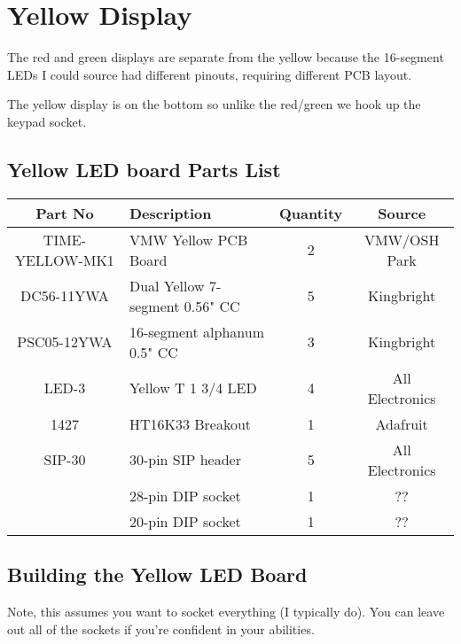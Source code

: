 \documentclass[11pt]{article}
\begin{document}
\pagebreak
\section{Yellow Display}

The red and green displays are separate from the yellow because
the 16-segment LEDs I could source had different pinouts, requiring
different PCB layout.

The yellow display is on the bottom so unlike the red/green we
hook up the keypad socket.

\subsection{Yellow LED board Parts List}

\begin{tabular}{|c|l|c|c|}
\hline
Part No   &  Description    &  Quantity    &   Source \\
\hline
\hline
TIME-YELLOW-MK1& VMW Yellow PCB Board          & 2 & VMW/OSH Park\\ %
\hline
DC56-11YWA     & Dual Yellow 7-segment 0.56" CC& 5 & Kingbright\\ %
\hline
PSC05-12YWA    & 16-segment alphanum 0.5" CC   & 3 & Kingbright\\ %
\hline
LED-3          & Yellow T 1 3/4 LED            & 4 & All Electronics\\ %
\hline
1427           & HT16K33 Breakout              & 1 & Adafruit\\ %
\hline
SIP-30	       & 30-pin SIP header             & 5 & All Electronics\\ %
\hline
               & 28-pin DIP socket             & 1 & ?? \\ %
\hline
               & 20-pin DIP socket             & 1 & ?? \\ %
\hline
\end{tabular}


\subsection{Building the Yellow LED Board}

Note, this assumes you want to socket everything (I typically do).
You can leave out all of the sockets if you're confident in your
abilities.
\end{document}
